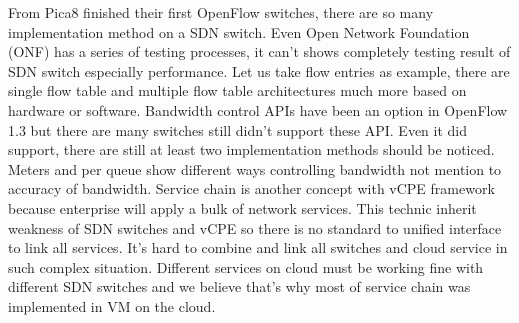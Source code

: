 \documentclass[10pt,journal]{IEEEtran}
\begin{document}
From Pica8\cite{pica8-switch} finished their first OpenFlow switches, there are so many implementation method on a SDN switch. Even Open Network Foundation (ONF)\cite{onf} has a series of testing processes, it can’t shows completely testing result of SDN switch especially performance. Let us take flow entries as example, there are single flow table and multiple flow table architectures much more based on hardware or software. Bandwidth control APIs have been an option in OpenFlow 1.3 but there are many switches still didn’t support these API. Even it did support, there are still at least two implementation methods should be noticed. Meters and per queue show different ways controlling bandwidth not mention to accuracy of bandwidth.
Service chain\cite{service-chain} is another concept with vCPE framework because enterprise will apply a bulk of network services. This technic inherit weakness of SDN switches and vCPE so there is no standard to unified interface to link all services. It’s hard to combine and link all switches and cloud service in such complex situation. Different services on cloud must be working fine with different SDN switches and we believe that’s why most of service chain was implemented in VM on the cloud.
\end{document}
